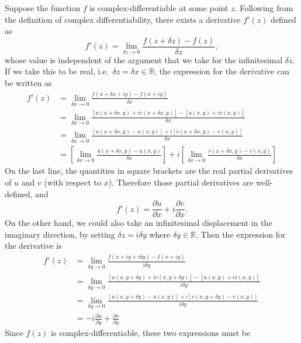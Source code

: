 \documentclass[10pt,a4paper]{article}
\begin{document}
Suppose the function $f$ is complex-differentiable at some point
$z$. Following from the definition of complex differentiability, there
exists a derivative $f'(z)$ defined as
\begin{equation}
f'(z) = \lim_{\delta z \rightarrow 0} \frac{f(z+\delta z) - f(z)}{\delta z},
\end{equation}
whose value is independent of the argument that we take for the
infinitesimal $\delta z$. If we take this to be real,
i.e.~$\delta z = \delta x \in \mathbb{R}$, the expression for the
derivative can be written as
\begin{align}
  f'(z) &= \lim_{\delta x \rightarrow 0} \frac{f(x+\delta x + i y) - f(x + i y)}{\delta x} \\
  &= \lim_{\delta x \rightarrow 0} \frac{\left[u(x+\delta x, y) + iv(x+\delta x, y)\right] - \left[u(x, y) + i v(x,y)\right]}{\delta x}\\
  &= \lim_{\delta x \rightarrow 0} \frac{\left[u(x+\delta x, y) - u(x,y)\right] + i \left[v(x+\delta x, y)-v(x,y)\right]}{\delta x} \\
  &= \left[ \lim_{\delta x \rightarrow 0} \frac{u(x+\delta x, y) - u(x,y)}{\delta x}\right] + i \left[ \lim_{\delta x \rightarrow 0} \frac{v(x+\delta x, y) - v(x,y)}{\delta x}\right]
\end{align}
On the last line, the quantities in square brackets are the real
partial derivatives of $u$ and $v$ (with respect to $x$). Therefore
those partial derivatives are well-defined, and
\begin{equation}
f'(z) = \frac{\partial u}{\partial x} + i \frac{\partial v}{\partial x}.
\end{equation}
On the other hand, we could also take an infinitesimal displacement in
the imaginary direction, by setting $\delta z = i \delta y$ where
$\delta y \in \mathbb{R}$. Then the expression for the derivative is
\begin{align}
  f'(z) &= \lim_{\delta y \rightarrow 0} \frac{f(x+ i y + i\delta y) - f(x + i y)}{i\delta y} \\
  &= \lim_{\delta y \rightarrow 0} \frac{\left[u(x, y+\delta y) + iv(x, y+\delta y)\right] - \left[u(x, y) + i v(x,y)\right]}{i\delta y}\\
  &= \lim_{\delta y \rightarrow 0} \frac{\left[u(x, y+\delta y) - u(x,y)\right] + i \left[v(x, y+\delta y)-v(x,y)\right]}{i\delta y} \\
  & = -i\frac{\partial u}{\partial y} + \frac{\partial v}{\partial y}
\end{align}
Since $f(z)$ is complex-differentiable, these two expressions must be
\end{document}
